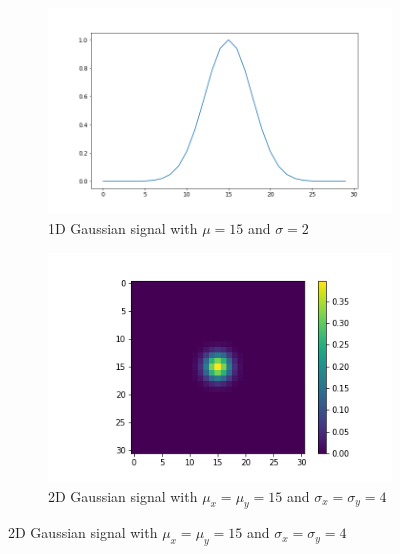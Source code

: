 		\begin{figure}
		    \centering
		    \begin{subfigure}[t]{0.3\textwidth}
		        \includegraphics[width=\textwidth]{graphs/gauss_sigma_4.png}
		        \caption{1D Gaussian signal with $\mu=15$ and $\sigma=2$}
		    \end{subfigure}%
		    \begin{subfigure}[t]{0.3\textwidth}
		        \includegraphics[width=\textwidth]{images/gauss_sigma_2.png}
		        \caption{2D Gaussian signal with $\mu_x = \mu_y = 15$ and $\sigma_x = \sigma_y = 4$}
		    \end{subfigure}
		    

\end{figure}
